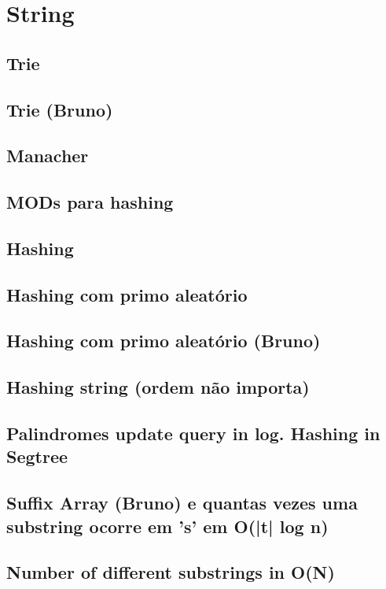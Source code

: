 \section{String}

\subsection{Trie}


\subsection{Trie (Bruno)}


\subsection{Manacher}


\subsection{MODs para hashing}


\subsection{Hashing}


\subsection{Hashing com primo aleatório}


\subsection{Hashing com primo aleatório (Bruno)}


\subsection{Hashing string (ordem não importa)}


\subsection{Palindromes update query in log. Hashing in Segtree}


\subsection{Suffix Array (Bruno) e quantas vezes uma substring ocorre em 's' em O(|t| log n)}


\subsection{Number of different substrings in O(N)}
